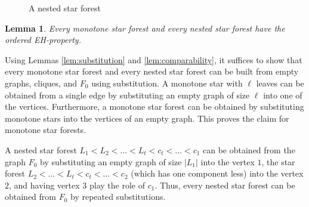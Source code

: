 \documentclass[11pt]{article}
\let\oldendproof\endproof
\renewenvironment{proof}[1][\proofname]{%
	\oldproof[\bf #1]%
}{\oldendproof}
\theoremstyle{plain}
\newtheorem{lemma}[theorem]{Lemma}
\begin{document}
\begin{figure}[h]
\centering
{}
\caption{A nested star forest}\label{figure-star-forest-2}
\end{figure}

\begin{lemma}\label{lem:star forests EH}
Every monotone star forest and every nested star forest have the ordered EH-property.  
\end{lemma}
\begin{proof}
Using Lemmas \ref{lem:substitution} and \ref{lem:comparability}, it suffices to show that every monotone star forest and every nested star forest can be built from empty graphs, cliques, and $F_0$ using substitution. 
A monotone star with $\ell$ leaves can be obtained from a single edge by substituting an empty graph of size $\ell$ into one of the vertices. Furthermore, a monotone star forest can be obtained by substituting monotone stars into the vertices of an empty graph. This proves the claim for monotone star forests. 

A nested star forest 
$L_1 < L_2 < \dots < L_t < c_t < \dots < c_1$ can be obtained from the graph $F_0$ by substituting an empty graph of size $|L_1|$ into the vertex $1$, the star forest 
$L_2 < \dots < L_t < c_t < \dots < c_2$ (which has one component less) into the vertex $2$, and having vertex $3$ play the role of $c_1$. Thus, every nested star forest can be obtained from $F_0$ by repeated substitutions.
\end{proof}
\end{document}
